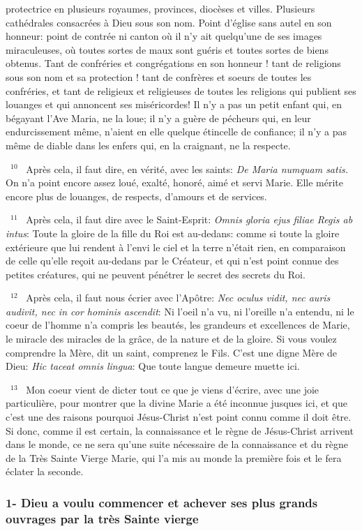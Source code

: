 \documentclass[paper=a5,pagesize=pdftex,fontsize=15pt,headinclude=on,twoside=off]{scrbook}
\newcommand{\negphantom}[1]{\settowidth{\dimen0}{#1}\hspace*{-\dimen0}}
\newcommand{\versenb}[1]{\par \vspace{10pt}~\negphantom{~${}^{#1}$~}${}^{#1}$~}
\newcommand{\latin}[1]{\emph{#1}}
\begin{document}
protectrice en plusieurs royaumes, provinces, diocèses et villes. Plusieurs cathédrales consacrées à Dieu sous son
nom. Point d'église sans autel en son honneur: point de contrée ni canton où il n'y ait quelqu'une de ses images
miraculeuses, où toutes sortes de maux sont guéris et toutes sortes de biens obtenus. Tant de confréries et
congrégations en son honneur ! tant de religions sous son nom et sa protection ! tant de confrères et soeurs de
toutes les confréries, et tant de religieux et religieuses de toutes les religions qui publient ses louanges et qui
annoncent ses miséricordes! Il n'y a pas un petit enfant qui, en bégayant l'Ave Maria, ne la loue; il n'y a guère de
pécheurs qui, en leur endurcissement même, n'aient en elle quelque étincelle de confiance; il n'y a pas même de
diable dans les enfers qui, en la craignant, ne la respecte.
\versenb{10} Après cela, il faut dire, en vérité, avec les saints:
\latin{De Maria numquam satis.}
On n'a point encore assez loué, exalté, honoré, aimé et servi Marie. Elle mérite encore plus de louanges, de
respects, d'amours et de services.
\versenb{11} Après cela, il faut dire avec le Saint-Esprit: \latin{Omnis gloria ejus filiae Regis ab intus}: Toute la gloire de la fille du
Roi est au-dedans: comme si toute la gloire extérieure que lui rendent à l'envi le ciel et la terre n'était rien, en
comparaison de celle qu'elle reçoit au-dedans par le Créateur, et qui n'est point connue des petites créatures, qui
ne peuvent pénétrer le secret des secrets du Roi.
\versenb{12} Après cela, il faut nous écrier avec l'Apôtre: \latin{Nec oculus vidit, nec auris audivit, nec in cor hominis ascendit}: Ni
l'oeil n'a vu, ni l'oreille n'a entendu, ni le coeur de l'homme n'a compris les beautés, les grandeurs et excellences
de Marie, le miracle des miracles de la grâce, de la nature et de la gloire. Si vous voulez comprendre la Mère, dit
un saint, comprenez le Fils. C'est une digne Mère de Dieu: \latin{Hic taceat omnis lingua}: Que toute langue demeure
muette ici.
\versenb{13} Mon coeur vient de dicter tout ce que je viens d'écrire, avec une joie particulière, pour montrer que la divine
Marie a été inconnue jusques ici, et que c'est une des raisons pourquoi Jésus-Christ n'est point connu comme il
doit être. Si donc, comme il est certain, la connaissance et le règne de Jésus-Christ arrivent dans le monde, ce ne
sera qu'une suite nécessaire de la connaissance et du règne de la Très Sainte Vierge Marie, qui l'a mis au monde
la première fois et le fera éclater la seconde.

\subsubsection{1- Dieu a voulu commencer et achever ses plus grands ouvrages par la très Sainte vierge}
\end{document}
